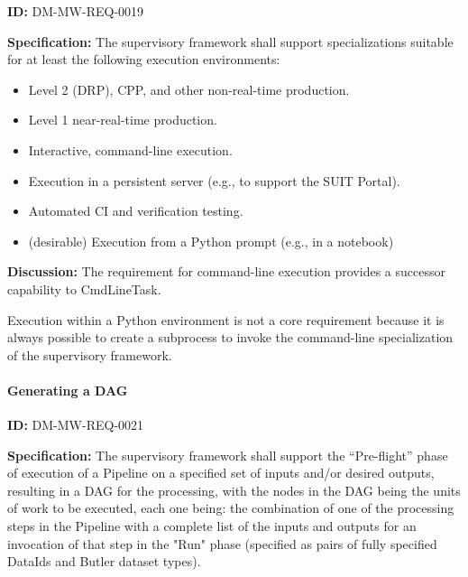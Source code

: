 \documentclass[SE,toc,lsstdraft]{lsstdoc}
\begin{document}
\label{DM-MW-REQ-0019}
\textbf{ID:} DM-MW-REQ-0019

\textbf{Specification:}
The supervisory framework shall support specializations suitable for at least the following execution environments:



    \begin{itemize}
\item
Level 2 (DRP), CPP, and other non-real-time production.

\item
Level 1 near-real-time production.

\item
Interactive, command-line execution.

\item
Execution in a persistent server (e.g., to support the SUIT Portal).

\item
Automated CI and verification testing.

\item
(desirable) Execution from a Python prompt (e.g., in a notebook)

    \end{itemize}

\textbf{Discussion:}
The requirement for command-line execution provides a successor capability to CmdLineTask.

Execution within a Python environment is not a core requirement because it is always possible to create a subprocess to invoke the command-line specialization of the supervisory framework.




\paragraph{Generating a DAG}\hfill  %

\label{DM-MW-REQ-0021}
\textbf{ID:} DM-MW-REQ-0021

\textbf{Specification:}
The supervisory framework shall support the “Pre-flight” phase of execution of a Pipeline on a specified set of inputs and/or desired outputs, resulting in a DAG for the processing, with the nodes in the DAG being the units of work to be executed, each one being: the combination of one of the processing steps in the Pipeline with a complete list of the inputs and outputs for an invocation of that step in the "Run" phase (specified as pairs of fully specified DataIds and Butler dataset types).
\end{document}
